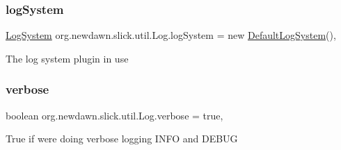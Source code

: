 \subsubsection{\texorpdfstring{log\+System}{logSystem}}
{\footnotesize\ttfamily \mbox{\hyperlink{interfaceorg_1_1newdawn_1_1slick_1_1util_1_1_log_system}{Log\+System}} org.\+newdawn.\+slick.\+util.\+Log.\+log\+System = new \mbox{\hyperlink{classorg_1_1newdawn_1_1slick_1_1util_1_1_default_log_system}{Default\+Log\+System}}()\hspace{0.3cm}{\ttfamily [static]}, {\ttfamily [private]}}

The log system plugin in use \mbox{\label{classorg_1_1newdawn_1_1slick_1_1util_1_1_log_af438e0ccf09b79bc870bd66fb9a02150}} 
\subsubsection{\texorpdfstring{verbose}{verbose}}
{\footnotesize\ttfamily boolean org.\+newdawn.\+slick.\+util.\+Log.\+verbose = true\hspace{0.3cm}{\ttfamily [static]}, {\ttfamily [private]}}

True if we\textquotesingle{}re doing verbose logging I\+N\+FO and D\+E\+B\+UG 